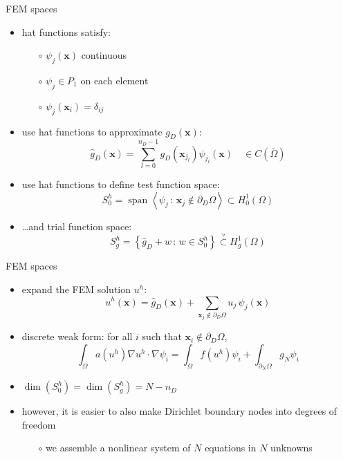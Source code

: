 \documentclass[hide notes,intlimits,usenames,dvipsnames]{beamer}
\newcommand{\bx}{\mathbf{x}}
\newcommand{\grad}{\nabla}
\newcommand{\Span}{\operatorname{span}}
\begin{document}
\begin{frame}{FEM spaces}
\vspace{4mm}

\begin{itemize}
\item hat functions satisfy:
    \begin{itemize}
    \item[$\circ$] $\psi_j(\bx)$ continuous
    \item[$\circ$] $\psi_j \in P_1$ on each element
    \item[$\circ$] $\psi_j(\bx_i)=\delta_{ij}$
    \end{itemize}

\vspace{-19mm}

\hfill 
\item use hat functions to approximate $g_D(\bx)$:
\begin{equation*}
\hat g_D(\bx) = \sum_{l=0}^{n_D-1} g_D(\bx_{j_l}) \psi_{j_l}(\bx) \quad \in C(\overline\Omega)
\end{equation*}
\item use hat functions to define test function space:
\begin{equation*}
S_{0}^h = \Span\left<\psi_j \,:\, \bx_j \notin \partial_D \Omega\right> \subset H_0^1(\Omega)
\end{equation*}
\item \dots and trial function space:
\begin{equation*}
S_{g}^h = \left\{\hat g_D + w \,:\, w \in S_{0}^h\right\} \stackrel{?}{\subset} H_g^1(\Omega)
\end{equation*}
\end{itemize}
\end{frame}


\begin{frame}{FEM spaces}
\begin{itemize}
\item expand the FEM solution $u^h$:
\begin{equation*}
u^h(\bx) = \hat g_D(\bx) + \sum_{\bx_j \notin \partial_D \Omega} u_j\, \psi_j(\bx)
\end{equation*}
\item discrete weak form:  for all $i$ such that $\bx_i \notin \partial_D \Omega$,
\begin{equation*}
\int_\Omega a(u^h) \grad u^h \cdot \grad \psi_i = \int_\Omega f(u^h) \psi_i + \int_{\partial_N\Omega} g_N \psi_i  \tag{DWF}
\end{equation*}
\item $\dim(S_{0}^h)=\dim(S_{g}^h)=N-n_D$
\item however, it is easier to also make Dirichlet boundary nodes into degrees of freedom
    \begin{itemize}
    \item[$\circ$] we assemble a nonlinear system of $N$ equations in $N$ unknowns
    \end{itemize}
\end{itemize}
\end{frame}
\end{document}
